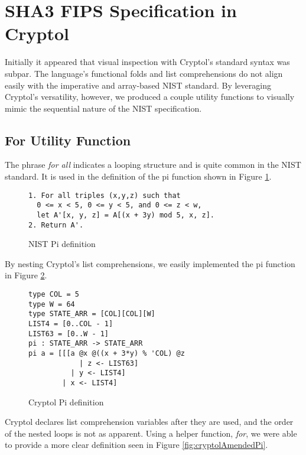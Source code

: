 \section{SHA3 FIPS Specification in Cryptol}
\label{sec:fips}
Initially it appeared that visual inspection with Cryptol's standard syntax was subpar.
The language's functional folds and list comprehensions do not align easily with the imperative 
and array-based NIST standard. By leveraging Cryptol's versatility, however, we produced a couple 
utility functions to visually mimic the sequential nature of the NIST specification. 

\subsection{For Utility Function}
The phrase \emph{for all} indicates a looping structure and is quite common in the NIST standard. 
It is used in the definition of the pi function shown in Figure \ref{fig:nistPi}.

\begin{figure}[h]
  \centering
  \begin{lstlisting}[basewidth = {.5em},basicstyle={\scriptsize}]
1. For all triples (x,y,z) such that 
  0 <= x < 5, 0 <= y < 5, and 0 <= z < w,
  let A'[x, y, z] = A[(x + 3y) mod 5, x, z].
2. Return A'.
  \end{lstlisting}
  \caption{NIST Pi definition}
  \label{fig:nistPi}
\end{figure}
    
By nesting Cryptol's list comprehensions, we easily implemented the pi function in Figure 
\ref{fig:cryptolPi}. 

\begin{figure}[h]
  \centering
\begin{lstlisting}[language=Cryptol]
type COL = 5 
type W = 64
type STATE_ARR = [COL][COL][W]
LIST4 = [0..COL - 1]
LIST63 = [0..W - 1]
pi : STATE_ARR -> STATE_ARR
pi a = [[[a @x @((x + 3*y) % 'COL) @z 
            | z <- LIST63] 
          | y <- LIST4] 
        | x <- LIST4]
\end{lstlisting}
\caption{Cryptol Pi definition}
\label{fig:cryptolPi}
\end{figure}

Cryptol declares list comprehension variables after they are used, and the order of the
nested loops is not as apparent. Using a helper function, \emph{for}, we were able to provide
a more clear definition seen in Figure \ref{fig:cryptolAmendedPi}.

